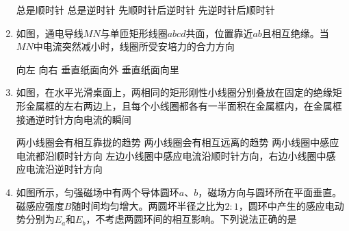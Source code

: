 \begin{enumerate}
\begin{minipage}[h!]{0.7\linewidth}
\vspace{0.3em}
\fourchoices
{总是顺时针}
{总是逆时针}
{先顺时针后逆时针}
{先逆时针后顺时针}

\vspace{0.3em}
\end{minipage}
\hfill
\begin{minipage}[h!]{0.3\linewidth}
\flushright
\vspace{0.3em}

\vspace{0.3em}
\end{minipage}

\item 
{}
如图，通电导线$ MN $与单匝矩形线圈$ abcd $共面，位置靠近$ ab $且相互绝缘。当$ MN $中电流突然减小时，线圈所受安培力的合力方向  


\begin{minipage}[h!]{0.7\linewidth}
\vspace{0.3em}
\fourchoices
{向左}
{向右}
{垂直纸面向外}
{垂直纸面向里}
\vspace{0.3em}
\end{minipage}
\hfill
\begin{minipage}[h!]{0.3\linewidth}
\flushright
\vspace{0.3em}

\vspace{0.3em}
\end{minipage}

\item 
{}
如图，在水平光滑桌面上，两相同的矩形刚性小线圈分别叠放在固定的绝缘矩形金属框的左右两边上，且每个小线圈都各有一半面积在金属框内，在金属框接通逆时针方向电流的瞬间  
\begin{figure}[h!]
\centering

\end{figure}


\fourchoices
{两小线圈会有相互靠拢的趋势}
{两小线圈会有相互远离的趋势}
{两小线圈中感应电流都沿顺时针方向}
{左边小线圈中感应电流沿顺时针方向，右边小线圈中感应电流沿逆时针方向}

\item 
{}
如图所示，匀强磁场中有两个导体圆环$ a $、$ b $，磁场方向与圆环所在平面垂直。磁感应强度$ B $随时间均匀增大。两圆坏半径之比为$ 2:1 $，圆环中产生的感应电动势分别为$ E_a $和$ E_b $，不考虑两圆环间的相互影响。下列说法正确的是  
\begin{figure}[h!]
\centering

\end{figure}



\end{enumerate}
